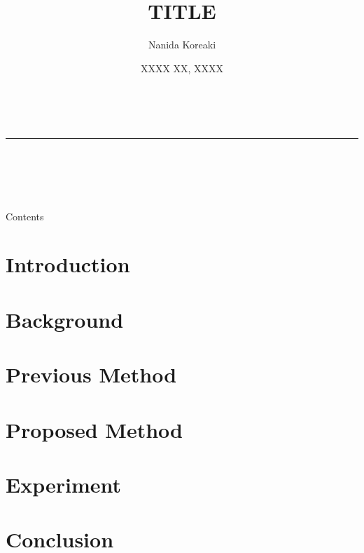 \documentclass[aspectratio=169, 10.5pt]{beamer}
\title[TITLE]{TITLE}
\institute[XXXX XXXX Lab.]{XXXX XXXX Lab.}
\author[Nanida Koreaki]{Nanida Koreaki}
\date[XXXX XX, XXXX]{XXXX XX, XXXX}
\begin{document}
\begin{frame}
	\begin{center}
		\vspace{1.0em}
		\Large
		\textbf{\inserttitle} \\
		\vspace{-1.0em}
		\noindent\textcolor{blue!20}{\rule{0.7\linewidth}{1.5pt}} \\
		\vspace{1.0em}
		\begin{minipage}{0.35\linewidth}
			\begin{center}
				\footnotesize
				\insertinstitute \\
				\insertauthor \\
				\insertdate
			\end{center}
		\end{minipage}
		\begin{minipage}{0.35\linewidth}
			\begin{center}
				\inserttitlegraphic
			\end{center}
		\end{minipage}
	\end{center}
\end{frame}

\begin{frame}{Contents}
	\tableofcontents
\end{frame}

\section{Introduction}


\section{Background}


\section{Previous Method}


\section{Proposed Method}


\section{Experiment}


\section{Conclusion}



\end{document}
